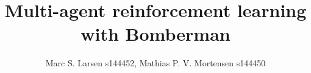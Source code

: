 

\setcounter{secnumdepth}{0}

\title{Multi-agent reinforcement learning with Bomberman} 
\author{Marc S. Larsen s144452, Mathias P. V. Mortensen s144450}
\date{\vspace{-5ex}}



\maketitle







